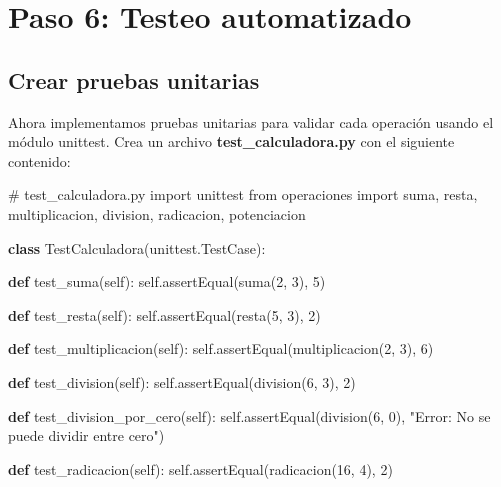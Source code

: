 \documentclass[
  a4paper,
  DIV=11,
  numbers=noendperiod,
  onepage,
  openany]{scrreprt}
\newenvironment{Shaded}{\begin{snugshade}}{\end{snugshade}}
\newcommand{\CommentTok}[1]{\textcolor[rgb]{0.37,0.37,0.37}{#1}}
\newcommand{\DecValTok}[1]{\textcolor[rgb]{0.68,0.00,0.00}{#1}}
\newcommand{\ImportTok}[1]{\textcolor[rgb]{0.00,0.46,0.62}{#1}}
\newcommand{\KeywordTok}[1]{\textcolor[rgb]{0.00,0.23,0.31}{\textbf{#1}}}
\newcommand{\NormalTok}[1]{\textcolor[rgb]{0.00,0.23,0.31}{#1}}
\newcommand{\StringTok}[1]{\textcolor[rgb]{0.13,0.47,0.30}{#1}}
\newcommand{\VariableTok}[1]{\textcolor[rgb]{0.07,0.07,0.07}{#1}}
\begin{document}
\section{Paso 6: Testeo automatizado}\label{paso-6-testeo-automatizado}

\subsection{Crear pruebas unitarias}\label{crear-pruebas-unitarias}

Ahora implementamos pruebas unitarias para validar cada operación usando
el módulo unittest. Crea un archivo \textbf{test\_calculadora.py} con el
siguiente contenido:

\begin{Shaded}
\begin{Highlighting}[]
\CommentTok{\# test\_calculadora.py}
\ImportTok{import}\NormalTok{ unittest}
\ImportTok{from}\NormalTok{ operaciones }\ImportTok{import}\NormalTok{ suma, resta, multiplicacion, division, radicacion, potenciacion}

\KeywordTok{class}\NormalTok{ TestCalculadora(unittest.TestCase):}

    \KeywordTok{def}\NormalTok{ test\_suma(}\VariableTok{self}\NormalTok{):}
        \VariableTok{self}\NormalTok{.assertEqual(suma(}\DecValTok{2}\NormalTok{, }\DecValTok{3}\NormalTok{), }\DecValTok{5}\NormalTok{)}

    \KeywordTok{def}\NormalTok{ test\_resta(}\VariableTok{self}\NormalTok{):}
        \VariableTok{self}\NormalTok{.assertEqual(resta(}\DecValTok{5}\NormalTok{, }\DecValTok{3}\NormalTok{), }\DecValTok{2}\NormalTok{)}

    \KeywordTok{def}\NormalTok{ test\_multiplicacion(}\VariableTok{self}\NormalTok{):}
        \VariableTok{self}\NormalTok{.assertEqual(multiplicacion(}\DecValTok{2}\NormalTok{, }\DecValTok{3}\NormalTok{), }\DecValTok{6}\NormalTok{)}

    \KeywordTok{def}\NormalTok{ test\_division(}\VariableTok{self}\NormalTok{):}
        \VariableTok{self}\NormalTok{.assertEqual(division(}\DecValTok{6}\NormalTok{, }\DecValTok{3}\NormalTok{), }\DecValTok{2}\NormalTok{)}

    \KeywordTok{def}\NormalTok{ test\_division\_por\_cero(}\VariableTok{self}\NormalTok{):}
        \VariableTok{self}\NormalTok{.assertEqual(division(}\DecValTok{6}\NormalTok{, }\DecValTok{0}\NormalTok{), }\StringTok{"Error: No se puede dividir entre cero"}\NormalTok{)}

    \KeywordTok{def}\NormalTok{ test\_radicacion(}\VariableTok{self}\NormalTok{):}
        \VariableTok{self}\NormalTok{.assertEqual(radicacion(}\DecValTok{16}\NormalTok{, }\DecValTok{4}\NormalTok{), }\DecValTok{2}\NormalTok{)}


\end{Highlighting}
\end{Shaded}
\end{document}
